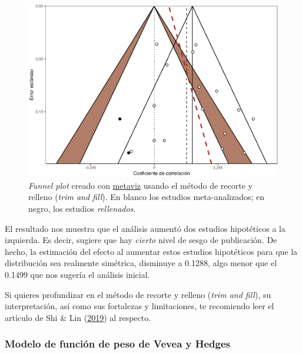 \documentclass[
  bookmarksnumbered]{article}
\begin{document}
\begin{figure}
\centering
\includegraphics{Meta-analysis_files/figure-latex/tf-plot2-1.pdf}
\caption{\label{fig:tf-plot2}\emph{Funnel plot} creado con \href{https://cran.r-project.org/web/packages/metaviz/vignettes/metaviz.html}{metaviz} usando el método de recorte y relleno (\emph{trim and fill}). En blanco los estudios meta-analizados; en negro, los estudios \emph{rellenados}.}
\end{figure}

El resultado nos muestra que el análisis aumentó dos estudios hipotéticos a la izquierda. Es decir, sugiere que hay \emph{cierto} nivel de sesgo de publicación. De hecho, la estimación del efecto al aumentar estos estudios hipotéticos para que la distribución sea realmente simétrica, disminuye a 0.1288, algo menor que el 0.1499 que nos sugería el análisis inicial.

Si quieres profundizar en el método de recorte y relleno (\emph{trim and fill}), su interpretación, así como sus fortalezas y limitaciones, te recomiendo leer el artículo de Shi \& Lin (\protect\hyperlink{ref-shiTrimandfill2019}{2019}) al respecto.

\hypertarget{vevea-hedges}{%
\subsubsection{Modelo de función de peso de Vevea y Hedges}\label{vevea-hedges}}
\end{document}
